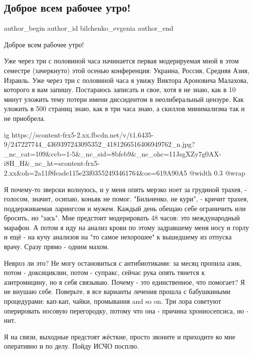 
 
 
 
 
 
\subsection{Доброе всем рабочее утро!}
\label{sec:23_10_2021.fb.bilchenko_evgenia.3.dobroje_utro_konferencia}
 
\ifcmt
 author_begin
   author_id bilchenko_evgenia
 author_end
\fi

Доброе всем рабочее утро!

Уже через три с половиной часа начинается первая модерируемая мной в этом
семестре (зачеркнуто) этой осенью конференция: Украина, Россия, Средняя Азия,
Израиль. Уже через три с половиной часа я увижу Виктора Ароновича Малахова,
которого я вам запишу. Постараюсь записать и свое, хотя я не знаю, как в 10
минут уложить тему потери имени диссидентом в неолиберальный цензуре. Как
уложить в 500 страниц знаю, как в три часа знаю, а скиллов минимализма так и не
приобрела.

\ifcmt
  ig https://scontent-frx5-2.xx.fbcdn.net/v/t1.6435-9/247227744_4369397243095352_4181266516406949762_n.jpg?_nc_cat=109&ccb=1-5&_nc_sid=8bfeb9&_nc_ohc=11JsgXZy7g0AX-i8H_H&_nc_ht=scontent-frx5-2.xx&oh=2a11f8feade115e23f03552493461764&oe=619A90A5
  @width 0.3
  @wrap 
\fi

Я почему-то зверски волнуюсь, и у меня опять мерзко ноет  за грудиной трахея, -
голосом, значит, осипаю, коньяк не помог. "Бильченко, не кури", - кричит
трахея, поддерживаемая ларингсом и мужем. Каждый день обещаю себе ограничить
или бросить, но "зась". Мне предстоит модерировать 48 часов: это международный
марафон. А потом я иду на анализ крови по этому задравшему меня носу и горлу и
ещё - на кучу анализов на "то самое нехорошее" к вышедшему из отпуска врачу.
Сразу прямо - одним махом. 

Невроз ли это? Не могу остановиться с антибиотиками: за месяц пропила азик,
потом - доксициклин, потом - супракс, сейчас рука опять тянется к азитромицину,
но я себя связываю. Почему - это единственное, что помогает? Я не внушаю себе.
Поверьте, я все варианты лечения прошла с бабушкиными процедурами: кап-кап,
чайки, промывания and so on. Три лора советуют оперировать носовую перегородку,
потому что она - причина хрониосепсиса, но - нит. 

Я на связи, выходные предстоят жёсткие, просто звоните и приходите ко мне
оперативно и по делу. Пойду ИСЧО посплю.
